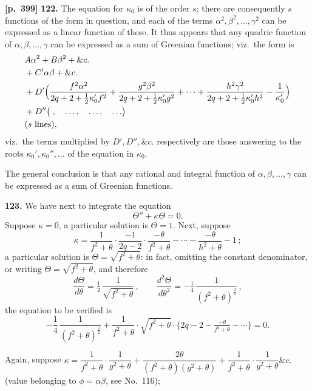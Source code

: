 \documentclass[11pt,a4paper]{article}
\begin{document}
\noindent\textbf{[p.~399]}\quad
\textbf{122.} The equation for $\kappa_{0}$ is of the order $s$; there are consequently $s$ functions of the form in question, and each of the terms $\alpha^{2}, \beta^{2}, \ldots, \gamma^{2}$ can be expressed as a linear function of these. It thus appears that any quadric function of $\alpha, \beta, \ldots, \gamma$ can be expressed as a sum of Greenian functions; viz.\ the form is
\[
\begin{aligned}
& A \alpha^{2} + B\beta^{2} + \&c.\\
& + C'\alpha\beta + \&c.\\
& + D'\Bigl(\frac{f^{2}\alpha^{2}}{2q + 2 + \tfrac{1}{2}\kappa_{0}' f^{2}} + \frac{g^{2}\beta^{2}}{2q + 2 + \tfrac{1}{2}\kappa_{0}' g^{2}} + \cdots + \frac{h^{2}\gamma^{2}}{2q + 2 + \tfrac{1}{2}\kappa_{0}' h^{2}} - \frac{1}{\kappa_{0}'}\Bigr)\\
& + D''\bigl(\;,\quad\ldots,\quad\ldots,\quad\ldots\bigr)\\
& (s\text{ lines}),
\end{aligned}
\]
viz.\ the terms multiplied by $D', D'',\&c.$ respectively are those answering to the roots $\kappa_{0}', \kappa_{0}'', \ldots$ of the equation in $\kappa_{0}$.

The general conclusion is that any rational and integral function of $\alpha, \beta, \ldots, \gamma$ can be expressed as a sum of Greenian functions.

\textbf{123.} We have next to integrate the equation
\[
\Theta'' + \kappa\Theta = 0.
\]
Suppose $\kappa = 0$, a particular solution is $\Theta = 1$. Next, suppose
\[
\kappa = \frac{1}{f^{2}+\theta}\cdot \frac{-1}{2q - 2}\cdot\frac{-\theta}{f^{2}+\theta} - \cdots - \frac{-\theta}{h^{2}+\theta} - 1\,;
\]
a particular solution is $\Theta = \sqrt{f^{2}+\theta}$:
in fact, omitting the constant denominator, or writing $\Theta = \sqrt{f^{2}+\theta}$, and therefore
\[
\frac{d\Theta}{d\theta} = \tfrac{1}{2}\,\frac{1}{\sqrt{f^{2}+\theta}}\,,\qquad \frac{d^{2}\Theta}{d\theta^{2}} = -\tfrac{1}{4}\,\frac{1}{(f^{2}+\theta)^{\tfrac{3}{2}}}\,,
\]
the equation to be verified is
\[
-\frac{1}{4}\,\frac{1}{(f^{2}+\theta)^{\tfrac{3}{2}}} + \frac{1}{f^{2}+\theta}\cdot\sqrt{f^{2}+\theta}\cdot\bigl\{2q - 2 - \tfrac{-\theta}{f^{2}+\theta} - \cdots\bigr\} = 0.
\]

Again, suppose $\kappa = \dfrac{1}{f^{2}+\theta}\cdot\dfrac{1}{g^{2}+\theta} + \dfrac{2\theta}{(f^{2}+\theta)(g^{2}+\theta)} + \dfrac{1}{f^{2}+\theta}\cdot\dfrac{1}{g^{2}+\theta}\&c.$ (value belonging to $\phi = \alpha\beta$, see No.~116);
\end{document}
